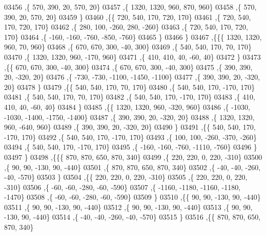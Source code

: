 \begin{DoxyCode}
03456     ,\{   570,   390,    20,   570,    20\}
03457     ,\{  1320,  1320,   960,   870,   960\}
03458     ,\{   570,   390,    20,   570,    20\}
03459     \}
03460    ,\{\{   720,   540,   170,   720,   170\}
03461     ,\{   720,   540,   170,   720,   170\}
03462     ,\{   280,   100,  -260,   280,  -260\}
03463     ,\{   720,   540,   170,   720,   170\}
03464     ,\{  -160,  -160,  -760,  -850,  -760\}
03465     \}
03466    \}
03467   ,\{\{\{  1320,  1320,   960,    70,   960\}
03468     ,\{   670,   670,   300,   -40,   300\}
03469     ,\{   540,   540,   170,    70,   170\}
03470     ,\{  1320,  1320,   960,  -170,   960\}
03471     ,\{   410,   410,    40,   -60,    40\}
03472     \}
03473    ,\{\{   670,   670,   300,   -40,   300\}
03474     ,\{   670,   670,   300,   -40,   300\}
03475     ,\{   390,   390,    20,  -320,    20\}
03476     ,\{  -730,  -730, -1100, -1450, -1100\}
03477     ,\{   390,   390,    20,  -320,    20\}
03478     \}
03479    ,\{\{   540,   540,   170,    70,   170\}
03480     ,\{   540,   540,   170,  -170,   170\}
03481     ,\{   540,   540,   170,    70,   170\}
03482     ,\{   540,   540,   170,  -170,   170\}
03483     ,\{   410,   410,    40,   -60,    40\}
03484     \}
03485    ,\{\{  1320,  1320,   960,  -320,   960\}
03486     ,\{ -1030, -1030, -1400, -1750, -1400\}
03487     ,\{   390,   390,    20,  -320,    20\}
03488     ,\{  1320,  1320,   960,  -640,   960\}
03489     ,\{   390,   390,    20,  -320,    20\}
03490     \}
03491    ,\{\{   540,   540,   170,  -170,   170\}
03492     ,\{   540,   540,   170,  -170,   170\}
03493     ,\{   100,   100,  -260,  -370,  -260\}
03494     ,\{   540,   540,   170,  -170,   170\}
03495     ,\{  -160,  -160,  -760, -1110,  -760\}
03496     \}
03497    \}
03498   ,\{\{\{   870,   870,   650,   870,   340\}
03499     ,\{   220,   220,     0,   220,  -310\}
03500     ,\{    90,    90,  -130,    90,  -440\}
03501     ,\{   870,   870,   650,   870,   340\}
03502     ,\{   -40,   -40,  -260,   -40,  -570\}
03503     \}
03504    ,\{\{   220,   220,     0,   220,  -310\}
03505     ,\{   220,   220,     0,   220,  -310\}
03506     ,\{   -60,   -60,  -280,   -60,  -590\}
03507     ,\{ -1160, -1180, -1160, -1180, -1470\}
03508     ,\{   -60,   -60,  -280,   -60,  -590\}
03509     \}
03510    ,\{\{    90,    90,  -130,    90,  -440\}
03511     ,\{    90,    90,  -130,    90,  -440\}
03512     ,\{    90,    90,  -130,    90,  -440\}
03513     ,\{    90,    90,  -130,    90,  -440\}
03514     ,\{   -40,   -40,  -260,   -40,  -570\}
03515     \}
03516    ,\{\{   870,   870,   650,   870,   340\}

\end{DoxyCode}

